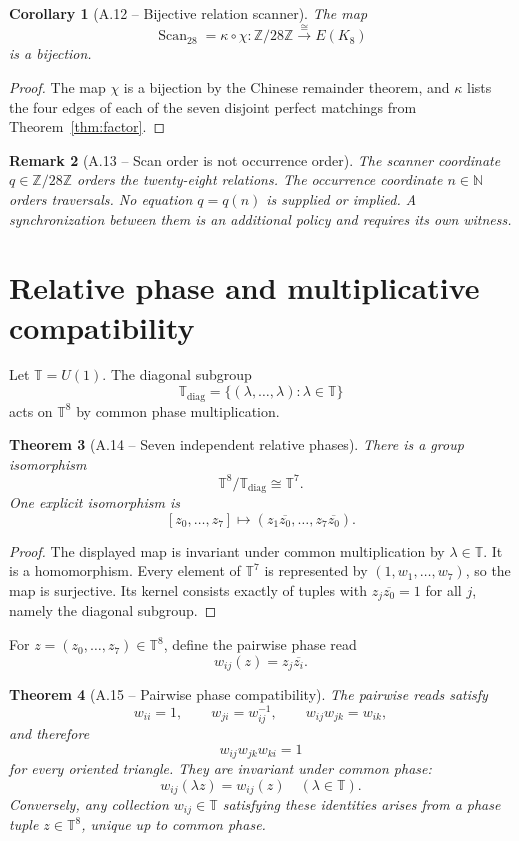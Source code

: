 \documentclass[11pt,letterpaper]{article}
\theoremstyle{relationstyle}
\newtheorem{theorem}{Theorem}[section]
\newtheorem{corollary}[theorem]{Corollary}
\newtheorem{remark}[theorem]{Remark}
\newcommand{\N}{\mathbb{N}}
\newcommand{\Z}{\mathbb{Z}}
\newcommand{\T}{\mathbb{T}}
\newcommand{\Scan}{\operatorname{Scan}_{28}}
\newcommand{\diagT}{\T_{\mathrm{diag}}}
\newcommand{\Ztwentyeight}{\Z/28\Z}
\begin{document}
\begin{corollary}[A.12 -- Bijective relation scanner]\label{cor:scanner}
The map
\[
\Scan=\kappa\circ\chi:\Ztwentyeight\overset{\cong}{\longrightarrow}E(K_8)
\]
is a bijection.
\end{corollary}

\begin{proof}
The map $\chi$ is a bijection by the Chinese remainder theorem, and $\kappa$ lists the four edges of each of the seven disjoint perfect matchings from Theorem~\ref{thm:factor}.
\end{proof}

\begin{remark}[A.13 -- Scan order is not occurrence order]
The scanner coordinate $q\in\Ztwentyeight$ orders the twenty-eight relations.  The occurrence coordinate $n\in\N$ orders traversals.  No equation $q=q(n)$ is supplied or implied.  A synchronization between them is an additional policy and requires its own witness.
\end{remark}

\section{Relative phase and multiplicative compatibility}\label{sec:phasequotient}

Let $\T=U(1)$.  The diagonal subgroup
\[
\diagT=\{(\lambda,\ldots,\lambda):\lambda\in\T\}
\]
acts on $\T^8$ by common phase multiplication.

\begin{theorem}[A.14 -- Seven independent relative phases]\label{thm:quotient}
There is a group isomorphism
\[
\T^8/\diagT\cong\T^7.
\]
One explicit isomorphism is
\[
[z_0,\ldots,z_7]
\longmapsto
(z_1\overline{z_0},\ldots,z_7\overline{z_0}).
\]
\end{theorem}

\begin{proof}
The displayed map is invariant under common multiplication by $\lambda\in\T$.  It is a homomorphism.  Every element of $\T^7$ is represented by $(1,w_1,\ldots,w_7)$, so the map is surjective.  Its kernel consists exactly of tuples with $z_j\overline{z_0}=1$ for all $j$, namely the diagonal subgroup.
\end{proof}

For $z=(z_0,\ldots,z_7)\in\T^8$, define the pairwise phase read
\[
w_{ij}(z)=z_j\overline{z_i}.
\]

\begin{theorem}[A.15 -- Pairwise phase compatibility]\label{thm:phasecompat}
The pairwise reads satisfy
\[
w_{ii}=1,
\qquad
w_{ji}=w_{ij}^{-1},
\qquad
w_{ij}w_{jk}=w_{ik},
\]
and therefore
\[
w_{ij}w_{jk}w_{ki}=1
\]
for every oriented triangle.  They are invariant under common phase:
\[
w_{ij}(\lambda z)=w_{ij}(z)
\quad(\lambda\in\T).
\]
Conversely, any collection $w_{ij}\in\T$ satisfying these identities arises from a phase tuple $z\in\T^8$, unique up to common phase.
\end{theorem}
\end{document}
